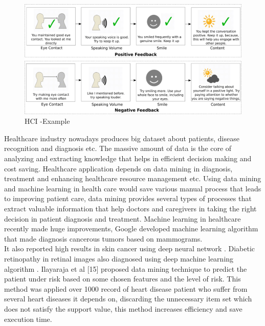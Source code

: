 \begin{figure}[h]
	\begin{center}
		\includegraphics[width =15.5cm]{4.PNG}
		\caption{HCI -Example}
		\label{ab}
	\end{center}
\end{figure}
Healthcare industry nowadays produces big dataset about patients, disease recognition and diagnosis etc. The massive amount of data is the core of analyzing and extracting knowledge that helps in efficient decision making and cost saving. Healthcare application depends
on data mining in diagnosis, treatment and enhancing healthcare resource management etc. Using data mining and machine learning in health care would save various manual process that leads to improving patient care, data mining provides several types of processes that extract valuable information that help doctors and caregivers in taking the right decision in patient diagnosis and treatment. Machine learning in healthcare recently made huge improvements, Google developed machine learning algorithm that made diagnosis cancerous tumors based on mammograms.\\It also reported high results in skin cancer using deep neural network . Diabetic retinopathy in retinal images also diagnosed using deep machine learning algorithm . Ilayaraja et al [15] proposed data mining technique to predict the patient under risk based on some chosen features and the level of risk. This method was applied over 1000 record of heart disease patient who suffer from several heart diseases it depends on, discarding the unnecessary item set which does not satisfy the support value, this method increases efficiency
and save execution time.

